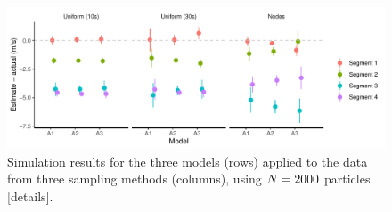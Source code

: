 \begin{knitrout}\small
{}\color{fgcolor}\begin{figure}
\includegraphics[width=\linewidth]{figure/sim3_pf-1} \caption[Simulation results for the three models (rows) applied to the data from three sampling methods (columns), using $\Np=2000$ particles]{Simulation results for the three models (rows) applied to the data from three sampling methods (columns), using $\Np=2000$ particles. [details].}\label{fig:sim3_pf}
\end{figure}


\end{knitrout}



